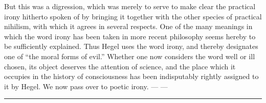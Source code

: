 \documentclass[12pt]{article}
\newcommand{\ombreak}{\par\medskip\begin{center}\rule{0.32\textwidth}{0.4pt}\end{center}\medskip}
\begin{document}
But this was a digression, which was merely to serve to make clear the practical irony hitherto spoken of by bringing it together with the other species of practical nihilism, with which it agrees in several respects. One of the many meanings in which the word irony has been taken in more recent philosophy seems hereby to be sufficiently explained. Thus Hegel uses the word irony, and thereby designates one of ``the moral forms of evil.'' Whether one now considers the word well or ill chosen, its object deserves the attention of science, and the place which it occupies in the history of consciousness has been indisputably rightly assigned to it by Hegel. We now pass over to poetic irony. --- ---

\ombreak
\end{document}
